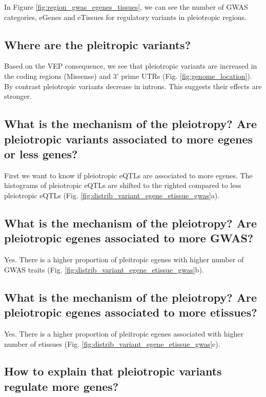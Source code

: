 In Figure \ref{fig:region_gwas_egenes_tissues}, we can see the number of GWAS categories, eGenes and eTissues for regulatory variants in pleiotropic regions.

\subsection*{Where are the pleitropic variants?}

Based on the VEP consequence, we see that pleiotropic variants are increased in the coding regions (Missense) and 3' prime UTRs (Fig. \ref{fig:genome_location}).
By contrast pleiotropic variants decrease in introns.
This suggests their effects are stronger.

\subsection*{What is the mechanism of the pleiotropy? Are pleiotropic variants associated to more egenes or less genes?}

First we want to know if pleiotropic eQTLs are associated to more egenes.
The histograms of pleiotropic eQTLs are shifted to the righted compared to less pleiotropic eQTLs (Fig. \ref{fig:distrib_variant_egene_etissue_gwas}a).

\subsection*{What is the mechanism of the pleiotropy? Are pleiotropic egenes associated to more GWAS?}

Yes. There is a higher proportion of pleitropic egenes with higher number of GWAS traits (Fig. \ref{fig:distrib_variant_egene_etissue_gwas}b).

\subsection*{What is the mechanism of the pleiotropy? Are pleiotropic egenes associated to more etissues?}

Yes. There is a higher proportion of pleitropic egenes associated with higher number of etissues (Fig. \ref{fig:distrib_variant_egene_etissue_gwas}c).

\subsection*{How to explain that pleiotropic variants regulate more genes?}

